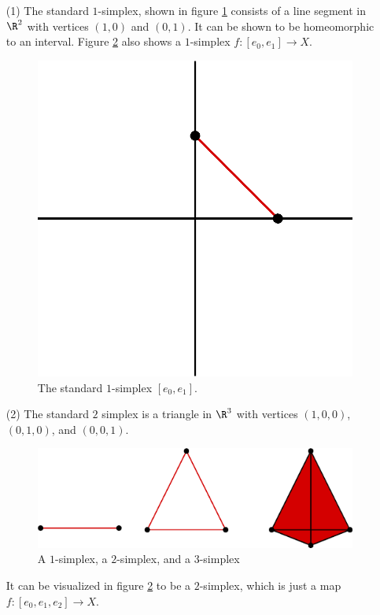 \begin{example}\label{example_1.12}
    \begin{enumerate}
        \item[(1)] The standard $1$-simplex, shown in figure \ref{figure_1.7}
            consists of a line segment in $\R^2$ with vertices $(1,0)$ and $(0,1)$.
            It can be shown to be homeomorphic to an interval. Figure
            \ref{figure_1.8} also shows a $1$-simplex  $f:[e_0,e_1]
            \xrightarrow{} X$.
            \begin{figure}[h]
                \centering
                \includegraphics[scale=0.5]{Figures/chapter1/standard_1_simplex.eps}
                \caption{The standard $1$-simplex  $[e_0,e_1]$.}
                \label{figure_1.7}
            \end{figure}

        \item[(2)] The standard $2$ simplex is a triangle in  $\R^3$ with
            vertices  $(1,0,0)$, $(0,1,0)$, and $(0,0,1)$.
            \begin{figure}[h]
                \centering
                \includegraphics[scale=0.5]{Figures/chapter1/simplices.eps}
                \caption{A $1$-simplex, a  $2$-simplex, and a  $3$-simplex}
                \label{figure_1.8}
            \end{figure}
            It can be visualized in figure \ref{figure_1.8} to be a $2$-simplex,
            which is just a map  $f:[e_0,e_1,e_2] \xrightarrow{} X$.


\end{enumerate}
\end{example}
